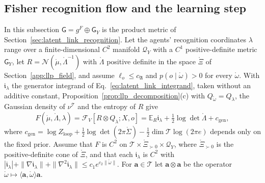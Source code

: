\subsection{Fisher recognition flow and the learning step}\label{app:llp_flow}

In this subsection $\mathsf G=g^F\oplus\mathsf G_Y$ is the product metric of Section~\ref{sec:latent_link_recognition}. Let the agents' recognition coordinates $\lambda$ range over a finite-dimensional $C^2$ manifold $\mathcal Q_Y$ with a $C^1$ positive-definite metric $\mathsf G_Y$, let $R=\mathcal N(\mathring\mu,\mathring\Lambda^{-1})$ with $\mathring\Lambda$ positive definite in the space $\mathring\Xi$ of Section~\ref{app:llp_field}, and assume $\ell_o\leq c_{\mathfrak A}$ and $p(o\mid\mathring\omega)>0$ for every $\mathring\omega$. With $\mathfrak i_\lambda$ the generator integrand of Eq.~\eqref{eq:latent_link_integrand}, taken without an additive constant, Proposition~\ref{prop:llp_decomposition}(c) with $Q_{\mathring\omega}=Q_\lambda$, the Gaussian density of $\nu^{\mathcal T}$ and the entropy of $R$ give
\begin{equation}
F(\mathring\mu,\mathring\Lambda,\lambda)=\mathcal F_V[R\otimes Q_\lambda;X,o]=\mathbb E_R\mathfrak i_\lambda+\tfrac12\log\det\mathring\Lambda+c_{\mathrm{gen}},
\label{eq:llp_flow_free_energy}
\end{equation}
where $c_{\mathrm{gen}}=\log Z_{\mathrm{loop}}+\frac12\log\det(2\pi\mathring\Sigma)-\frac12\dim\mathcal T\log(2\pi e)$ depends only on the fixed prior. Assume that $F$ is $C^2$ on $\mathcal T\times\mathring\Xi_{\succ0}\times\mathcal Q_Y$, where $\mathring\Xi_{\succ0}$ is the positive-definite cone of $\mathring\Xi$, and that each $\mathfrak i_\lambda$ is $C^2$ with $|\mathfrak i_\lambda|+\|\nabla\mathfrak i_\lambda\|+\|\nabla^2\mathfrak i_\lambda\|\leq c_1e^{c_2\|\mathring\omega\|}$. For $\mathbf a\in\mathcal T$ let $\mathbf a\otimes\mathbf a$ be the operator $\mathring\omega\mapsto\langle\mathbf a,\mathring\omega\rangle\mathbf a$.

